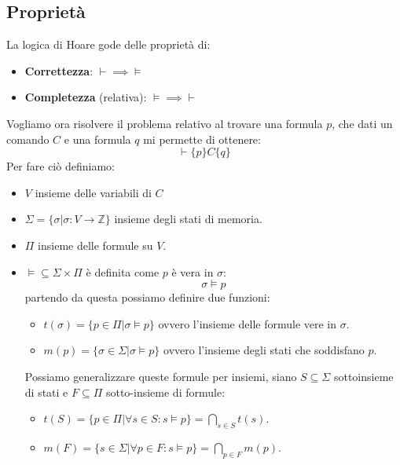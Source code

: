 \subsection{Proprietà}
La logica di Hoare gode delle proprietà di:
\begin{itemize}
    \item \textbf{Correttezza}: $\vdash \implies \models$
    \item \textbf{Completezza} (relativa): $\models \implies \vdash$
\end{itemize}
Vogliamo ora risolvere il problema relativo al trovare una formula $p$, che dati
un comando $C$ e una formula $q$ mi permette di ottenere:
\begin{equation}
    \vdash \{p\} C \{q\}
\end{equation}
Per fare ciò definiamo:
\begin{itemize}
    \item $V$ insieme delle variabili di $C$
    \item $\Sigma = \{\sigma | \sigma: V \to \mathbb{Z} \}$ insieme degli stati
          di memoria.
    \item $\Pi$ insieme delle formule su $V$.
    \item $\models \subseteq \Sigma \times \Pi$ è definita come $p$ è vera in
          $\sigma$:
          \begin{equation}
              \sigma \models p
          \end{equation}
          partendo da questa possiamo definire due funzioni:
          \begin{itemize}
              \item $t(\sigma) = \{p \in \Pi | \sigma \models p \}$ ovvero
                    l'insieme delle formule vere in $\sigma$.
              \item $m(p) = \{\sigma \in \Sigma | \sigma \models p \}$ ovvero
                    l'insieme degli stati che soddisfano $p$.
          \end{itemize}
          Possiamo generalizzare queste formule per insiemi, siano $S \subseteq
              \Sigma$ sottoinsieme di stati e $F \subseteq \Pi$ sotto-insieme di
          formule:
          \begin{itemize}
              \item $t(S) = \{p \in \Pi | \forall s \in S: s \models p \} =
                        \bigcap_{s \in S} t(s)$.
              \item $m(F) = \{s \in \Sigma | \forall p \in F: s \models p\} =
                        \bigcap_{p \in F} m(p)$.
          \end{itemize}
\end{itemize}
